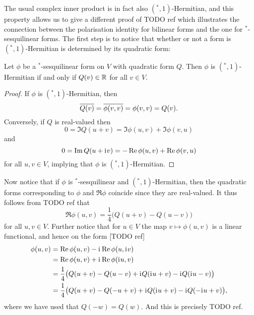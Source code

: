 The usual complex inner product is in fact also $({}^*,1)$-Hermitian, and this property allows us to give a different proof of TODO ref which illustrates the connection between the polarisation identity for bilinear forms and the one for ${}^*$-sesquilinear forms. The first step is to notice that whether or not a form is $({}^*,1)$-Hermitian is determined by its quadratic form:
%
\begin{lemma}
    Let $\phi$ be a ${}^*$-sesquilinear form on $V$ with quadratic form $Q$. Then $\phi$ is $({}^*,1)$-Hermitian if and only if $Q(v) \in \mathbb{R}$ for all $v \in V$.
\end{lemma}

\begin{proof}
    If $\phi$ is $({}^*,1)$-Hermitian, then
    \begin{equation*}
        \conj{Q(v)}
            = \conj{\phi(v,v)}
            = \phi(v,v)
            = Q(v).
    \end{equation*}
    Conversely, if $Q$ is real-valued then
    \begin{equation*}
        0
            = \Im Q(u+v)
            = \Im \phi(u,v) + \Im \phi(v,u)
    \end{equation*}
    and
    \begin{equation*}
        0
            = \Im Q(u+\iu v)
            = - \Re \phi(u,v) + \Re \phi(v,u)
    \end{equation*}
    for all $u,v \in V$, implying that $\phi$ is $({}^*,1)$-Hermitian.
\end{proof}
%
Now notice that if $\phi$ is ${}^*$-sesquilinear and $({}^*,1)$-Hermitian, then the quadratic forms corresponding to $\phi$ and $\Re \phi$ coincide since they are real-valued. It thus follows from TODO ref that
%
\begin{equation*}
    \Re \phi(u,v)
        = \frac{1}{4} \bigl( Q(u+v) - Q(u-v) \bigr)
\end{equation*}
%
for all $u,v \in V$. Further notice that for $u \in V$ the map $v \mapsto \phi(u,v)$ is a linear functional, and hence on the form [TODO ref]
%
\begin{align*}
    \phi(u,v)
        &= \Re \phi(u,v) - \iu \Re \phi(u, \iu v) \\
        &= \Re \phi(u,v) + \iu \Re \phi(\iu u, v) \\
        &= \frac{1}{4} \bigl( Q(u+v) - Q(u-v) + \iu Q(\iu u + v) - \iu Q(\iu u - v) \bigr) \\
        &= \frac{1}{4} \bigl( Q(u+v) - Q(-u+v) + \iu Q(\iu u + v) - \iu Q(-\iu u + v) \bigr),
\end{align*}
%
where we have used that $Q(-w) = Q(w)$. And this is precisely TODO ref.